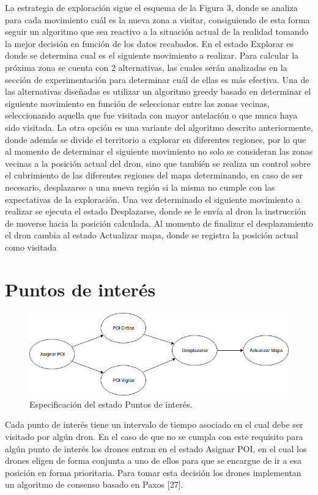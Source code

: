 La estrategia de exploración sigue el esquema de la Figura 3, donde se analiza para cada movimiento cuál es la nueva zona a visitar, consiguiendo de esta forma seguir un algoritmo que sea reactivo a la situación actual de la realidad tomando la mejor decisión en función de los datos recabados.
En el estado Explorar es donde se determina cual es el siguiente movimiento a realizar. Para calcular la próxima zona se cuenta con 2 alternativas, las cuales serán analizadas en la sección de experimentación para determinar cuál de ellas es más efectiva. Una de las alternativas diseñadas es utilizar un algoritmo greedy basado en determinar el siguiente movimiento en función de seleccionar entre las zonas vecinas, seleccionando aquella que fue visitada con mayor antelación o que nunca haya sido visitada. La otra opción es una variante del algoritmo descrito anteriormente, donde además se divide el territorio a explorar en diferentes regiones, por lo que al momento de determinar el siguiente movimiento no solo se consideran las zonas vecinas a la posición actual del dron, sino que también se realiza un control sobre el cubrimiento de las diferentes regiones del mapa determinando, en caso de ser necesario, desplazarse a una nueva región si la misma no cumple con las expectativas de la exploración.
Una vez determinado el siguiente movimiento a realizar se ejecuta el estado Desplazarse, donde se le envía al dron la instrucción de moverse hacia la posición calculada.
Al momento de finalizar el desplazamiento el dron cambia al estado Actualizar mapa, donde se registra la posición actual como visitada 

\section {Puntos de interés}

\begin{figure}[h!]
	\label{fig:comp}
	\includegraphics[width=.8\textwidth]{imagenes/chap5/image4}
	\caption{Especificación del estado Puntos de interés.}
\end{figure}

Cada punto de interés tiene un intervalo de tiempo asociado en el cual debe ser visitado por algún dron. En el caso de que no se cumpla con este requisito para algún punto de interés los drones entran en el estado Asignar POI, en el cual los drones eligen de forma conjunta a uno de ellos para que se encargue de ir a esa posición en forma prioritaria. Para tomar esta decisión los drones implementan un algoritmo de consenso basado en Paxos [27].



